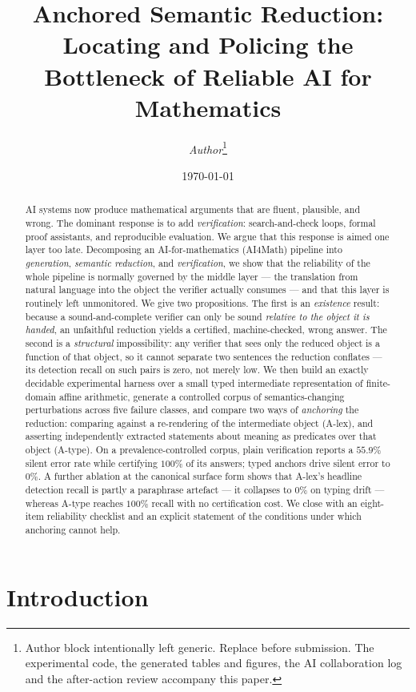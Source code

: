 \documentclass[11pt]{article}
\title{\bfseries Anchored Semantic Reduction:\\ Locating and Policing the Bottleneck of Reliable AI for Mathematics}
\author{%
  \textit{Author}\thanks{%
    Author block intentionally left generic. Replace before submission.
    The experimental code, the generated tables and figures, the AI
    collaboration log and the after-action review accompany this paper.}%
}
\date{\today}
\newcommand{\Alex}{\textsf{A-lex}}
\newcommand{\Atype}{\textsf{A-type}}
\theoremstyle{definition}
\begin{document}
\maketitle

\begin{abstract}
\noindent
AI systems now produce mathematical arguments that are fluent, plausible, and
wrong. The dominant response is to add \emph{verification}: search-and-check
loops, formal proof assistants, and reproducible evaluation. We argue that this
response is aimed one layer too late. Decomposing an AI-for-mathematics (AI4Math)
pipeline into \emph{generation}, \emph{semantic reduction}, and
\emph{verification}, we show that the reliability of the whole pipeline is
normally governed by the middle layer --- the translation from natural language
into the object the verifier actually consumes --- and that this layer is
routinely left unmonitored. We give two propositions. The first is an
\emph{existence} result: because a sound-and-complete verifier can only be sound
\emph{relative to the object it is handed}, an unfaithful reduction yields a
certified, machine-checked, wrong answer. The second is a \emph{structural}
impossibility: any verifier that sees only the reduced object is a function of
that object, so it cannot separate two sentences the reduction conflates --- its
detection recall on such pairs is zero, not merely low.
We then build an exactly decidable experimental harness over a small typed
intermediate representation of finite-domain affine arithmetic, generate a
controlled corpus of semantics-changing perturbations across five failure
classes, and compare two ways of \emph{anchoring} the reduction: comparing
against a re-rendering of the intermediate object (\Alex), and asserting
independently extracted statements about meaning as predicates over that object
(\Atype). On a prevalence-controlled corpus, plain verification reports a
$55.9\%$ silent error rate while certifying $100\%$ of its answers; typed anchors
drive silent error to $0\%$. A further ablation at the canonical surface form
shows that \Alex's headline detection recall is partly a paraphrase artefact ---
it collapses to $0\%$ on typing drift --- whereas \Atype{} reaches $100\%$ recall
with no certification cost. We close with an eight-item reliability checklist and
an explicit statement of the conditions under which anchoring cannot help.
\end{abstract}

\section{Introduction}
\label{sec:intro}
\end{document}
